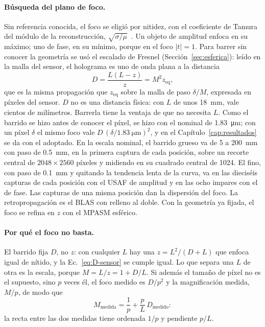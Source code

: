 \paragraph{Búsqueda del plano de foco.} Sin referencia conocida, el foco se
eligió por nitidez, con el coeficiente de Tamura del módulo de la
reconstrucción, $\sqrt{\sigma/\mu}$~\cite{memmolo2011}. Un objeto de amplitud
enfoca en su máximo; uno de fase, en su mínimo, porque en el foco $|t| = 1$.
Para barrer sin conocer la geometría se usó el escalado de Fresnel
(Sección~\ref{sec:esferica}): leído en la malla del sensor, el holograma es uno
de onda plana a la distancia
\begin{equation}
  D = \frac{L(L - z)}{z} = M^2 z_\mathrm{eq},
  \label{eq:D-sensor}
\end{equation}
que es la misma propagación que $z_\mathrm{eq}$ sobre la malla de paso
$\delta/M$, expresada en píxeles del sensor. $D$ no es una distancia física:
con $L$ de unos \SI{18}{mm}, vale cientos de milímetros. Barrerla tiene la
ventaja de que no necesita $L$. Como el barrido se hizo antes de conocer el
píxel, se hizo con el nominal de \SI{1.83}{\micro\metre}; con un píxel $\delta$
el mismo foco vale $D\,(\delta/\SI{1.83}{\micro\metre})^2$, y en el
Capítulo~\ref{cap:resultados} se da con el adoptado. En la escala nominal, el
barrido grueso va de 5 a \SI{200}{mm} con paso de \SI{0.5}{mm}, en la primera
captura de cada posición, sobre un recorte
central de $2048\times2560$ píxeles y midiendo en su cuadrado central de
1024. El fino, con paso de \SI{0.1}{mm} y quitando la tendencia lenta de la
curva, va en las dieciséis capturas de cada posición con el USAF de amplitud
y en las ocho impares con el de fase. Las capturas de una misma posición dan
la dispersión del foco. La retropropagación es el BLAS con relleno al doble.
Con la geometría ya fijada, el foco se refina en $z$ con el MPASM esférico.

\paragraph{Por qué el foco no basta.} El barrido fija $D$, no $z$: con
cualquier $L$ hay una $z = L^2/(D + L)$ que enfoca igual de nítido, y la
Ec.~\eqref{eq:D-sensor} se cumple igual. Lo que separa una $L$ de otra es la
escala, porque $M = L/z = 1 + D/L$. Si además el tamaño de píxel no es el
supuesto, sino $p$ veces él, el foco medido es $D/p^2$ y la magnificación
medida, $M/p$, de modo que
\begin{equation}
  M_\mathrm{medida} = \frac{1}{p} + \frac{p}{L}\,D_\mathrm{medido}:
  \label{eq:M-D}
\end{equation}
la recta entre las dos medidas tiene ordenada $1/p$ y pendiente $p/L$.

